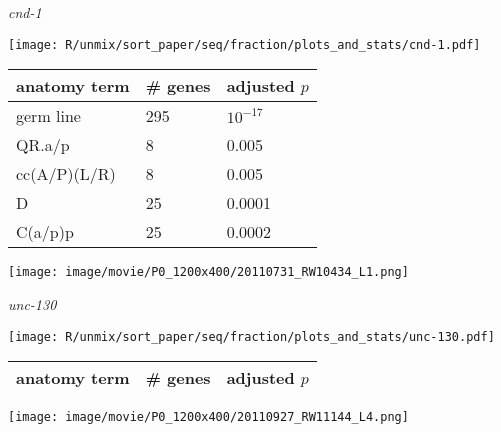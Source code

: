 \documentclass[serif,9pt]{beamer}
\begin{document}
\begin{frame}{{\em cnd-1}}
\begin{minipage}{0.4\textwidth}
\texttt{[image: R/unmix/sort\_paper/seq/fraction/plots\_and\_stats/cnd-1.pdf]}
\end{minipage}
\begin{minipage}{0.58\textwidth}
\begin{table}[!tbp]\scriptsize
\begin{tabular}{lll}
anatomy term & \# genes & adjusted $p$ \\
\hline
germ line & 295 & $10^{-17}$ \\
QR.a/p & 8 & 0.005 \\
cc(A/P)(L/R) & 8 & 0.005 \\
D & 25 & 0.0001 \\
C(a/p)p & 25 & 0.0002 
\end{tabular}
\end{table}
\end{minipage}

\texttt{[image: image/movie/P0\_1200x400/20110731\_RW10434\_L1.png]}

\end{frame}

\begin{frame}{{\em unc-130}}

\begin{minipage}{0.4\textwidth}
\texttt{[image: R/unmix/sort\_paper/seq/fraction/plots\_and\_stats/unc-130.pdf]}
\end{minipage}
\begin{minipage}{0.58\textwidth}
\begin{table}[!tbp]\scriptsize
\begin{tabular}{lll}
anatomy term & \# genes & adjusted $p$ \\
\hline

\end{tabular}
\end{table}
\end{minipage}

\texttt{[image: image/movie/P0\_1200x400/20110927\_RW11144\_L4.png]}

\end{frame}
\end{document}
